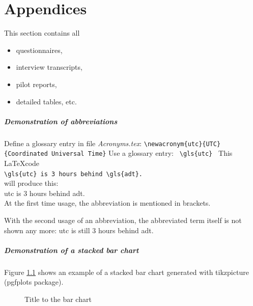 \cleardoublepage  %
\chapter{Appendices}
\label{cha:Appendices}      %

This section contains all
\begin{itemize}
	\item questionnaires,
	\item interview transcripts,
	\item pilot reports,
	\item detailed tables, etc.
\end{itemize}

\paragraph{Demonstration of abbreviations}
Define a glossary entry in file \textit{Acronyms.tex}:
\newline
\verb!\newacronym{utc}{UTC}{Coordinated Universal Time}!
\newline
Use a glossary entry: \verb! \gls{utc} !
\newline
This \LaTeX code \\

\verb*|\gls{utc} is 3 hours behind \gls{adt}.| \\

will produce this: \\

\gls{utc} is 3 hours behind \gls{adt}.\\

At the first time usage, the abbreviation is mentioned in brackets.

With the second usage of an abbreviation, the abbreviated term itself is not shown any more:
\gls{utc} is still 3 hours behind \gls{adt}.\\

\paragraph{Demonstration of a stacked bar chart}
Figure \ref{fig:StackedBarChart} shows an example of a stacked bar chart generated with tikzpicture (pgfplots package).

\begin{figure}
	\centering
	\caption{\label{fig:StackedBarChart}Title to the bar chart}
\end{figure}

